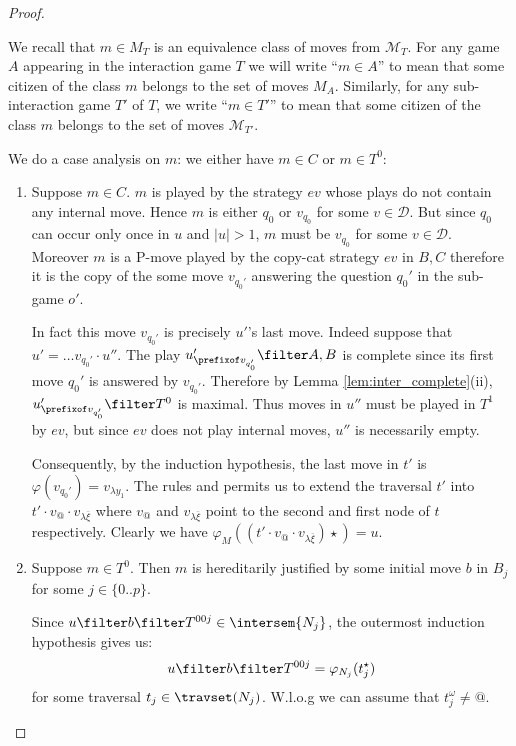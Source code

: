 \begin{proof}
\begin{enumerate}[$\bullet$]
\begin{enumerate}
We recall that $m \in M_T$ is an equivalence class of moves
from $\mathcal{M}_T$. For any game $A$ appearing in the
interaction game $T$ we will write ``$m \in A$'' to mean
that some citizen of the class $m$ belongs to the set of
moves $M_A$. Similarly, for any sub-interaction game $T'$ of
$T$, we write ``$m \in T'$'' to mean that some citizen of
the class $m$ belongs to the set of moves
$\mathcal{M}_{T'}$.

We do a case analysis on $m$: we either have $m\in C$ or $m\in T^0$:
    \begin{enumerate}[-]
    \item Suppose $m \in C$. $m$ is played by the strategy $ev$ whose plays do not contain any internal move. Hence $m$ is either $q_0$ or $v_{q_0}$ for some
    $v\in\mathcal{D}$. But since $q_0$ can occur only once in
    $u$ and $|u|>1$, $m$ must be $v_{q_0}$ for some
    $v\in \mathcal{D}$.  Moreover $m$ is a P-move played by the
    copy-cat strategy $ev$ in $B,C$ therefore it is the copy
    of the some move $v_{q_0'}$ answering the question $q_0'$ in the sub-game $o'$.

    In fact this move $v_{q_0'}$ is precisely $u'$'s last move. Indeed
    suppose that $u' = \ldots v_{q_0'} \cdot u''$. The play
    $u'_{\prefixof v_{q_0'}}\filter A,B$ is complete since its
    first move $q_0'$ is answered by $v_{q_0'}$. Therefore by
    Lemma \ref{lem:inter_complete}(ii), $u'_{\prefixof
    v_{q_0'}}\filter T^0$ is maximal. Thus moves in $u''$ must
    be played in $T^1$ by $ev$, but since $ev$ does not play internal
    moves, $u''$ is necessarily empty.

    Consequently, by the induction hypothesis, the last move in $t'$ is $\varphi(v_{q_0'}) = v_{\lambda y_1}$.
    The rules  and  permits us to extend
    the traversal $t'$ into $t' \cdot v_@ \cdot v_{\lambda \overline{\xi}}$ where $v_@$ and $v_{\lambda
    \overline{\xi}}$ point to the second and first node of $t$ respectively. Clearly we have $\varphi_M((t'\cdot v_@ \cdot v_{\lambda \overline{\xi}})\star) = u$.

    \item Suppose $m\in T^0$. Then $m$ is hereditarily justified by some initial move $b$ in $B_j$ for some $j\in \{0..p\}$.

        Since $u \filter b \filter T^{00j} \in \intersem{N_j}$, the outermost induction hypothesis gives us:
        \begin{equation}
        u \filter b \filter T^{00j} = \varphi_{N_j}(t_j^\star)  \label{eqn:corresp_outmost_ih}
        \end{equation}
          for some traversal $t_j \in \travset(N_j)$. W.l.o.g we can assume that $t_j^\omega \neq @$.


\end{enumerate}
\end{enumerate}
\end{enumerate}
\end{proof}
